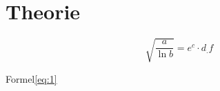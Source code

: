 
\section{Theorie}
\label{sec:Theorie}

\begin{equation}
\sqrt{\frac{a}{\ln{b}}} = e^{c}\cdot d_.f \label{eq:1}
\end{equation}

Formel\eqref{eq:1}
